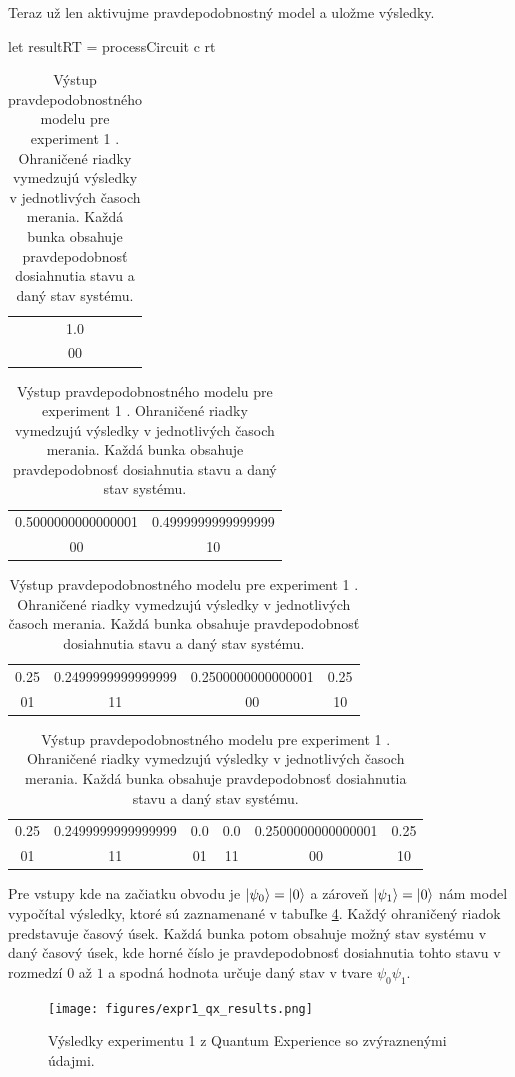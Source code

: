 Teraz už len aktivujme pravdepodobnostný model a uložme výsledky.
\begin{code}
let resultRT = processCircuit c rt
\end{code}

\begin{table}
\centering
\begin{tabular}{|c|}
\hline
1.0 \\ 
00 \\ 
\hline
\end{tabular}

\begin{tabular}{|c|c|}
\hline
0.5000000000000001 & 0.4999999999999999 \\ 
00 & 10 \\ 
\hline
\end{tabular}

\begin{tabular}{|c|c|c|c|}
\hline
0.25 & 0.2499999999999999 & 0.2500000000000001 & 0.25 \\ 
01 & 11 & 00 & 10 \\ 
\hline
\end{tabular}

\begin{tabular}{|c|c|c|c|c|c|}
\hline
0.25 & 0.2499999999999999 & 0.0 & 0.0 & 0.2500000000000001 & 0.25 \\ 
01 & 11 & 01 & 11 & 00 & 10 \\ 
\hline
\end{tabular}
\caption{\label{expr1_vystup} Výstup pravdepodobnostného modelu pre experiment 1
. Ohraničené riadky vymedzujú výsledky v jednotlivých časoch merania. Každá
bunka obsahuje pravdepodobnosť dosiahnutia stavu a daný stav systému.}
\end{table}

Pre vstupy kde na začiatku obvodu je \(\ket{\psi_0} = \ket{0}\) a zároveň
\(\ket{\psi_1} = \ket{0}\) nám model vypočítal výsledky, ktoré sú zaznamenané
v tabuľke \ref{expr1_vystup}. Každý ohraničený riadok predstavuje časový úsek.
Každá bunka potom obsahuje možný stav systému v daný časový úsek, kde horné
číslo je pravdepodobnosť dosiahnutia tohto stavu v rozmedzí \(0\) až \(1\) a 
spodná hodnota určuje daný stav v tvare \(\psi_0\psi_1\).

\begin{figure} 
	\centering 
	\texttt{[image: figures/expr1\_qx\_results.png]} 
	\caption{Výsledky experimentu 1 z Quantum Experience so zvýraznenými 
údajmi.}

    \label{expr1_qx_results}
\end{figure}

